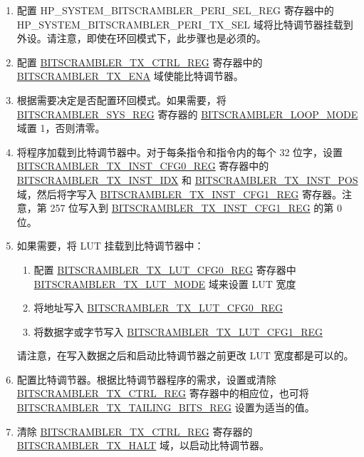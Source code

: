 \documentclass[main\_\_CN.tex]{subfiles}
\begin{document}
\begin{enumerate}
    \item 配置 HP\_SYSTEM\_BITSCRAMBLER\_PERI\_SEL\_REG 寄存器中的 HP\_SYSTEM\_BITSCRAMBLER\_PERI\_TX\_SEL 域将比特调节器挂载到外设。请注意，即使在环回模式下，此步骤也是必须的。
    \item 配置 \hyperref[regdesc:BITSCRAMBLERTXCTRLREG]{BITSCRAMBLER\_TX\_CTRL\_REG} 寄存器中的 \hyperref[fielddesc:BITSCRAMBLERTXENA]{BITSCRAMBLER\_TX\_ENA} 域使能比特调节器。
    \item 根据需要决定是否配置环回模式。如果需要，将 \hyperref[regdesc:BITSCRAMBLERSYSREG]{BITSCRAMBLER\_SYS\_REG} 寄存器的 \hyperref[fielddesc:BITSCRAMBLERLOOPMODE] {BITSCRAMBLER\_LOOP\_MODE} 域置 1，否则清零。
    \item 将程序加载到比特调节器中。对于每条指令和指令内的每个 32 位字，设置 \hyperref[regdesc:BITSCRAMBLERTXINSTCFG0REG]{BITSCRAMBLER\_TX\_INST\_CFG0\_REG} 寄存器中的 \hyperref[fielddesc:BITSCRAMBLERTXINSTIDX]{BITSCRAMBLER\_TX\_INST\_IDX} 和 \hyperref[fielddesc:BITSCRAMBLERTXINSTPOS]{BITSCRAMBLER\_TX\_INST\_POS} 域，然后将字写入 \hyperref[regdesc:BITSCRAMBLERTXINSTCFG1REG]{BITSCRAMBLER\_TX\_INST\_CFG1\_REG} 寄存器。注意，第 257 位写入到 \hyperref[regdesc:BITSCRAMBLERTXINSTCFG1REG]{BITSCRAMBLER\_TX\_INST\_CFG1\_REG} 的第 0 位。
    \item 如果需要，将 LUT 挂载到比特调节器中：
    \begin{enumerate}
        \item 配置 \hyperref[regdesc:BITSCRAMBLERTXLUTCFG0REG]{BITSCRAMBLER\_TX\_LUT\_CFG0\_REG} 寄存器中 \hyperref[fielddesc:BITSCRAMBLERTXLUTMODE] {BITSCRAMBLER\_TX\_LUT\_MODE} 域来设置 LUT 宽度
        \item 将地址写入 \hyperref[regdesc:BITSCRAMBLERTXLUTCFG0REG]{BITSCRAMBLER\_TX\_LUT\_CFG0\_REG}
        \item 将数据字或字节写入 \hyperref[regdesc:BITSCRAMBLERTXLUTCFG1REG]{BITSCRAMBLER\_TX\_LUT\_CFG1\_REG}
    \end{enumerate}
        请注意，在写入数据之后和启动比特调节器之前更改 LUT 宽度都是可以的。
    \item 配置比特调节器。根据比特调节器程序的需求，设置或清除 \hyperref[regdesc:BITSCRAMBLERTXCTRLREG]{BITSCRAMBLER\_TX\_CTRL\_REG} 寄存器中的相应位，也可将 \hyperref[regdesc:BITSCRAMBLERTXTAILINGBITSREG]{BITSCRAMBLER\_TX\_TAILING\_BITS\_REG} 设置为适当的值。
    \item 清除 \hyperref[regdesc:BITSCRAMBLERTXCTRLREG]{BITSCRAMBLER\_TX\_CTRL\_REG} 寄存器的\hyperref[fielddesc:BITSCRAMBLERTXHALT]{BITSCRAMBLER\_TX\_HALT} 域，以启动比特调节器。

\end{enumerate}
\end{document}
